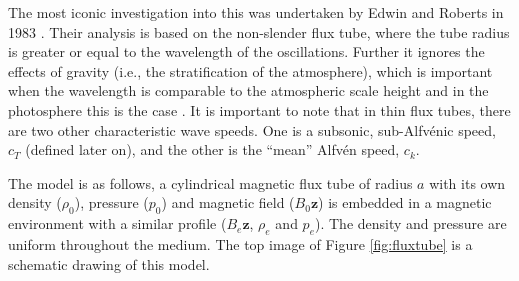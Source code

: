     The most iconic investigation into this was undertaken by Edwin and Roberts in 1983 \citep{WPMC}.
    Their analysis is based on the non-slender flux tube, where the tube radius is greater or equal to the wavelength of the oscillations.
    Further it ignores the effects of gravity (i.e., the stratification of the atmosphere), which is important when the wavelength is comparable to the atmospheric scale height and in the photosphere this is the case \citep{LNLMHD}. 
    It is important to note that in thin flux tubes, there are two other characteristic wave speeds.
    One is a subsonic, sub-Alfv\'{e}nic speed, $c_T$ (defined later on), and the other is the ``mean'' Alfv\'{e}n speed, $c_k$.

    The model is as follows, a cylindrical magnetic flux tube of radius $a$ with its own density ($\rho_0$), pressure ($p_0$) and magnetic field (${B}_0\textbf{\^{z}}$) is embedded in a magnetic environment with a similar profile (${B}_e \textbf{\^{z}}$, $\rho_e$ and $p_e$).   
    The density and pressure are uniform throughout the medium.
    The top image of Figure \ref{fig:fluxtube} is a schematic drawing of this model. 
        
